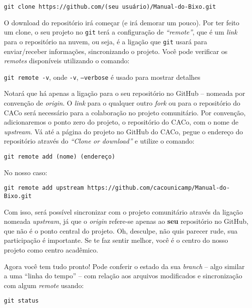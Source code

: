 \documentclass[a4paper,oneside,10pt]{memoir}
\begin{document}
\begin{center}
\texttt{git clone https://github.com/(seu usuário)/Manual-do-Bixo.git}
\end{center}

O download do repositório irá começar (e irá demorar um pouco). Por ter feito
um clone, o seu projeto no \texttt{git} terá a configuração de \emph{“remote”},
que é um \emph{link} para o repositório na nuvem, ou seja, é a ligação que
\texttt{git} usará para enviar/receber informações, sincronizando o projeto.
Você pode verificar os \emph{remotes} disponíveis utilizando o comando:

\begin{center}
\texttt{git remote -v}, onde \texttt{-v}, \texttt{--verbose} é usado para
mostrar detalhes
\end{center}

Notará que há apenas a ligação para o seu repositório no GitHub -- nomeada
por convenção de \emph{origin}. O \emph{link} para o qualquer outro \emph{fork}
ou para o repositório do CACo será necessário para a colaboração no projeto
comunitário. Por convenção, adicionaremos o ponto zero do projeto, o
repositório do CACo, com o nome de \emph{upstream}. Vá até a página do projeto
no GitHub do CACo, pegue o endereço do repositório através do \emph{“Clone or
download”} e utilize o comando:

\begin{center}
\texttt{git remote add (nome) (endereço)}
\end{center}

No nosso caso:
\begin{center}
\texttt{git remote add upstream
https://github.com/cacounicamp/Manual-do-Bixo.git}
\end{center}

Com isso, será possível sincronizar com o projeto comunitário através da
ligação nomeada \emph{upstream}, já que o \emph{origin} refere-se apenas ao
\textbf{seu} repositório no GitHub, que não é o ponto central do projeto. Oh,
desculpe, não quis parecer rude, sua participação é importante. Se te faz
sentir melhor, você é o centro do nosso projeto como centro acadêmico.

Agora você tem tudo pronto! Pode conferir o estado da sua \emph{branch} --
algo similar a uma ``linha do tempo'' -- com relação aos arquivos modificados
e sincronização com algum \emph{remote} usando:

\begin{center}
\texttt{git status}
\end{center}
\end{document}
